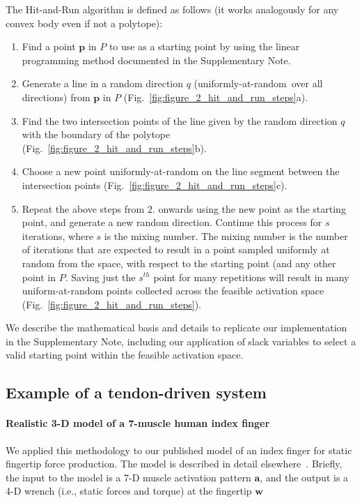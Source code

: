 \documentclass[9pt,twocolumn,twoside,lineno]{pnas-new}
\begin{document}
{The Hit-and-Run algorithm is defined as follows (it works analogously for any convex body even if not a polytope)\cite{lovasz1999hit}:
\begin{enumerate}
\item Find a point $\textbf{p}$ in $P$ to use as a starting point by using the linear programming method documented in the Supplementary Note.
\item Generate a line in a random direction $q$ (uniformly-at-random\ over all directions) from $\textbf{p}$ in $P$ (Fig.~\ref{fig:figure_2_hit_and_run_steps}a).
\item Find the two intersection points of the line given by the random direction $q$ with the boundary of the polytope (Fig.~\ref{fig:figure_2_hit_and_run_steps}b).
\item Choose a new point uniformly-at-random on the line segment between the intersection points (Fig.~\ref{fig:figure_2_hit_and_run_steps}c).
\item Repeat the above steps from $2.$ onwards using the new point as the starting point, and generate a new random direction.
Continue this process for $s$ iterations, where $s$ is the mixing number. The mixing number is the number of iterations that are expected to result in a point sampled uniformly at random from the space, with respect to the starting point (and any other point in $P$. Saving just the $s^{th}$ point for many repetitions will result in many uniform-at-random points collected across the feasible activation space (Fig.~\ref{fig:figure_2_hit_and_run_steps}).
\end{enumerate}

We describe the mathematical basis and details to replicate our implementation in the Supplementary Note, including our application of slack variables to select a valid starting point within the feasible activation space.

\subsection*{Example of a tendon-driven system}
\paragraph*{Realistic 3-D model of a 7-muscle human index finger}
\label{ss:finger}
We applied this methodology to our published model of an index finger for static fingertip force production.
The model is described in detail elsewhere~\cite{valero-cuevas2009computational}.
Briefly, the input to the model is a 7-D muscle activation pattern $\textbf{a}$, and the output is a 4-D wrench (i.e., static forces and torque) at the fingertip $\textbf{w}$

}
\end{document}
